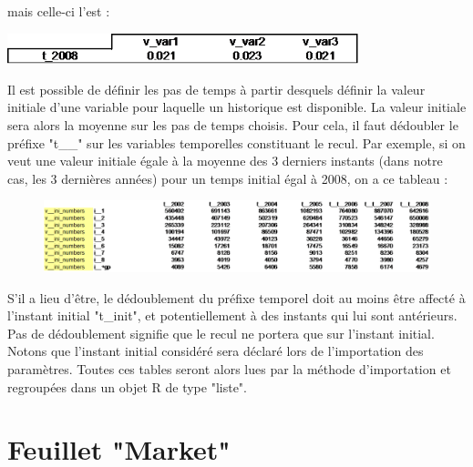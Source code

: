 \documentclass[12pt, colorinlistoftodos, notitlepage]{report}
\newenvironment{not used}[1]{%
    \longtable{%
        |>{\centering$\displaystyle}A{#1}{1}<{$}%
        |}\hline\ignorespaces}{%
    \endlongtable\ignorespacesafterend}
\newcommand\Warning{%
 \makebox[1.4em][c]{%
 \makebox[0pt][c]{\raisebox{.1em}{\small!}}%
 \makebox[0pt][c]{\color{red}\Large$\bigtriangleup$}}}%
\begin{document}
\begin{itemize}
    mais celle-ci l'est :

    \begin{minipage}{\linewidth}
        \centering
        \includegraphics[width = 10.2cm]{figures/param/stock7.png}
    \end{minipage}
    \vspace{12pt}

\end{itemize}


Il est possible de définir les pas de temps à partir desquels définir la valeur initiale d'une variable pour laquelle un historique est disponible. La valeur initiale sera alors la moyenne sur les pas de temps choisis. Pour cela, il faut dédoubler le préfixe "t\_\_" sur les variables temporelles constituant le recul. Par exemple, si on veut une valeur initiale égale à la moyenne des 3 derniers instants (dans notre cas, les 3 dernières années) pour un temps initial égal à 2008, on a ce tableau :

\begin{figure}[h!]
    \begin{center}
    \includegraphics[width = \textwidth]{figures/param/stock8.png}
    \end{center}
    \label{fig:time}
\end{figure}

\Warning S'il a lieu d'être, le dédoublement du préfixe temporel doit au moins être affecté à l'instant initial "t\_init", et potentiellement à des instants qui lui sont antérieurs. Pas de dédoublement signifie que le recul ne portera que sur l'instant initial. Notons que l'instant initial considéré sera déclaré lors de l'importation des paramètres. Toutes ces tables seront alors lues par la méthode d'importation et regroupées dans un objet R de type "liste".


\section{Feuillet "Market"}
\end{document}
